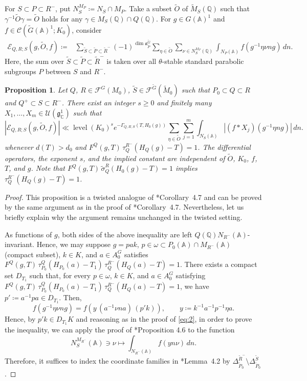 \documentclass[12pt]{amsart}
\theoremstyle{definition}
\theoremstyle{plain}
\newtheorem{proposition}[definition]{Proposition}
\theoremstyle{remark}
\def\C{\mathbb{C}}%
\def\Q{\mathbb{Q}}%
\def\A{\mathbb{A}}%
\newcommand{\fa}{\mathfrak{a}}
\newcommand{\fg}{\mathfrak{g}}
\newcommand{\cC}{\mathcal{C}}
\newcommand{\cF}{\mathcal{F}}
\newcommand{\cU}{\mathcal{U}}
\numberwithin{equation}{section}
\newcommand{\tG}{\widetilde{G}}
\newcommand{\tM}{\widetilde{M}}
\newcommand{\tP}{\widetilde{P}}
\newcommand{\tR}{\widetilde{R}}
\newcommand{\tS}{\widetilde{S}}
\newcommand{\tO}{\widetilde{O}}
\newcommand{\level}{\operatorname{level}}
\begin{document}
For $S\subset P\subset R^-$, put
$N_{S}^{M_P}\coloneqq N_{S}\cap M_P$.
Take a subset $\tO$ of $\tM_{S}(\Q)$ such that $\gamma^{-1}\widetilde{O}\gamma=\widetilde{O}$ holds for any $\gamma\in M_{S}(\Q)\cap Q(\Q)$. 
For $g\in G(\A)^1$ and
$f\in\cC(\tG(\A)^1;K_0)$, consider
\begin{equation}
 \begin{split}
 \mathcal E_{Q,R;S}(g,\tO,f)
   \coloneqq {}&
   \sum_{\tS\subset \tP\subset \tR^-}
       (-1)^{\dim\fa_{\tP}^{\tG}}
       \sum_{\eta\in \tO}\sum_{\nu\in N_{S}^{M_P}(\Q)}
       \int_{N_P(\A)}
          f(g^{-1}\eta\nu ng)\,dn .
 \end{split}
 \label{eq:tfl47-alternating-sum}
\end{equation}
Here, the sum over $\tS\subset \tP\subset \tR^-$ is taken over all $\theta$-stable standard parabolic subgroups $P$ between $S$ and $R^-$.
\begin{proposition}
\label{prop:tfl47}
Let $Q$, $R \in \cF^G(M_0)$, $\tS\in\cF^{\tG}(\tM_0)$ such that $P_0\subset Q\subset R$ and $Q^+\subset S\subset R^-$.   
There exist an integer $s\geq0$ and finitely many
$X_1,\ldots,X_m\in\cU(\fg_\C^1)$ such that
\[
 |\mathcal E_{Q,R;S}(g,\tO,f)|
 \ll
 \level(K_0)^s
 e^{-\Gamma_{Q,R;S}(T,H_0(g))}
 \sum_{\eta\in\tO}\sum_{j=1}^m\int_{N_{S}(\A)}
       |(f*X_j)(g^{-1}\eta n g)|\,dn.
\]
whenever $d(T)>d_0$ and $F^Q(g,T)\, \tau_Q^{R^-}(H_Q(g)-T)=1$.
The differential operators, the exponent $s$, and the implied
constant are independent of $\tO$, $K_0$, $f$, $T$, and $g$.
Note that $F^Q(g,T)\,\widetilde\sigma_Q^R(H_0(g)-T)=1$ implies $\tau_Q^{R^-}(H_Q(g)-T)=1$.
\end{proposition}
\begin{proof}
This proposition is a twisted analogue of \cite{FL16}*{Corollary~4.7} and can be proved by the same argument as in the proof of \cite{FL16}*{Corollary~4.7}. 
Nevertheless, let us briefly explain why the argument remains unchanged in the twisted setting.

As functions of $g$, both sides of the above inequality are left $Q(\Q)N_{R^-}(\A)$-invariant. 
Hence, we may suppose $g=pak$, $p\in\omega\subset P_0(\A)\cap M_{R^-}(\A)$ (compact subset), $k\in K$, and $a\in A_0^G$ satisfies $F^Q(g,T) \, \tau_{P_0}^Q(H_{P_0}(a)-T_1) \, \tau_Q^{R^-}(H_Q(a)-T)=1$. 
There exists a compact set $D_{T_1}$ such that, for every $p\in\omega$, $k\in K$, and $a\in A_0^G$ satisfying $F^Q(g,T) \, \tau_{P_0}^Q(H_{P_0}(a)-T_1) \, \tau_Q^{R^-}(H_Q(a)-T)=1$, we have $p'\coloneqq a^{-1}pa\in D_{T_1}$.
Then,
\[
f(g^{-1}\eta\nu ng)=f(  y  \, (a^{-1}\nu n a) \, (p'k)), \qquad y\coloneqq k^{-1}a^{-1}p^{-1} \eta a.         
\]
Hence, by $p'k\in D_{T_1}K$ and reasoning as in the proof of \eqref{eq:2}, in order to prove the inequality, we can apply the proof of \cite{FL16}*{Proposition 4.6} to the function
\[
N_{S}^{M_{R^-}}(\A) \ni \nu \mapsto \int_{N_{R^-}(\A)} f(y n\nu)\, dn.
\]
Therefore, it suffices to index the coordinate families in \cite{FL16}*{Lemma~4.2} by $\Delta_{\tP_0}^{\tR^-}\setminus\Delta_{\tP_0}^{\tS}$.
\end{proof}
\end{document}
